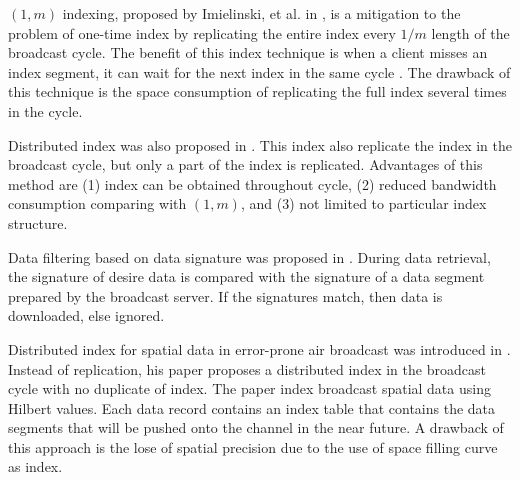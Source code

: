 $(1, m)$ indexing, proposed by Imielinski, et al. in
\cite{data_on_air}, is a mitigation to the problem of one-time
index by replicating the entire index every $1/m$ length of the
broadcast cycle. The benefit of this index technique is when a
client misses an index segment, it can wait for the next index in
the same cycle \cite{DBLP:journals/tmc/KuZW08}. The drawback of
this technique is the space consumption of replicating the full
index several times in the cycle.

Distributed index was also proposed in \cite{data_on_air}. This
index also replicate the index in the broadcast cycle, but only a
part of the index is replicated. Advantages of this method are (1)
index can be obtained throughout cycle, (2) reduced bandwidth
consumption comparing with $(1, m)$, and (3) not limited to
particular index structure.



Data filtering based on data signature was proposed in
\cite{signature_and_caching}. During data retrieval, the signature
of desire data is compared with the signature of a data segment
prepared by the broadcast server. If the signatures match, then
data is downloaded, else ignored.

Distributed index for spatial data in error-prone air broadcast
was introduced in \cite{dsi}. Instead of replication, his paper
proposes a distributed index in the broadcast cycle with no
duplicate of index. The paper index broadcast spatial data using
Hilbert values. Each data record contains an index table that
contains the data segments that will be pushed onto the channel in
the near future. A drawback of this approach is the lose of
spatial precision due to the use of space filling curve as index.


